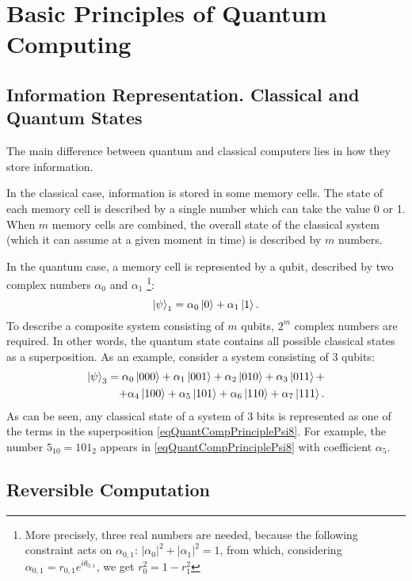\section{Basic Principles of Quantum Computing}

\subsection{Information Representation. Classical and Quantum
  States}
The main difference between quantum and classical computers lies in
how they store information.

In the classical case, information is stored in some memory cells.
The state of each memory cell is described by a single number
which can take the value 0 or 1. When $m$ memory cells are combined,
the overall state of the classical system (which it can
assume at a given moment in time) is described by $m$ numbers.

In the quantum case, a memory cell is represented by a qubit, described by two complex numbers $\alpha_0$ and $\alpha_1$
\footnote{More precisely, three real numbers are needed, because the following constraint acts on $\alpha_{0,1}$:
$\left|\alpha_0\right|^2 + \left|\alpha_1\right|^2 = 1$, from which, considering $\alpha_{0,1} = r_{0,1}e^{i \theta_{0,1}}$, we get $r_0^2 = 1 - r_1^2$}:
\[
\left|\psi\right>_1 = \alpha_0 \ket{ 0 } + \alpha_1 \ket{ 1 }.
\]
To describe a composite system consisting of $m$ qubits, 
$2^m$ complex numbers are required. In other words, the quantum state
contains all possible classical states as a superposition. As an example, consider a system consisting of 3
qubits:
\begin{eqnarray}
\left|\psi\right>_3 = 
\alpha_0 \ket{ 000 } + 
\alpha_1 \ket{ 001 } + 
\alpha_2 \ket{ 010 } + 
\alpha_3 \ket{ 011 } + 
\nonumber \\
+ 
\alpha_4 \ket{ 100 } + 
\alpha_5 \ket{ 101 } + 
\alpha_6 \ket{ 110 } + 
\alpha_7 \ket{ 111 }.
\label{eqQuantCompPrinciplePsi8}
\end{eqnarray}
As can be seen, any classical state of a system of 3 bits is represented as
one of the terms in the superposition
\eqref{eqQuantCompPrinciplePsi8}. For example, the number $5_{10}=101_2$ appears
in \eqref{eqQuantCompPrinciplePsi8} with coefficient $\alpha_5$.

\subsection{Reversible Computation}

